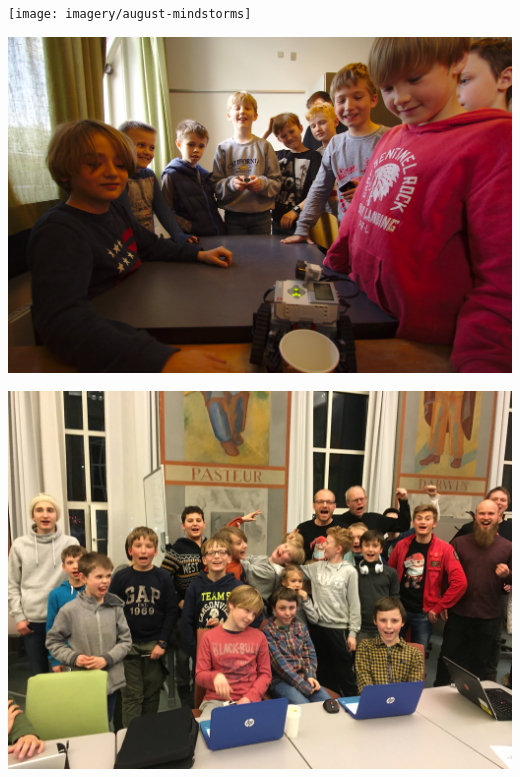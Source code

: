 \documentclass{beamer}
\begin{document}
\begin{frame}
 \vspace{5mm}
 \texttt{[image: imagery/august-mindstorms]}
\end{frame}

\begin{frame}
 \vspace{5mm}
 \includegraphics[width=\textwidth]{imagery/mindstorms-presentation}
\end{frame}

\begin{frame}
 \vspace{5mm}
 \includegraphics[width=\textwidth]{imagery/cpdiku}
\end{frame}



\end{document}
